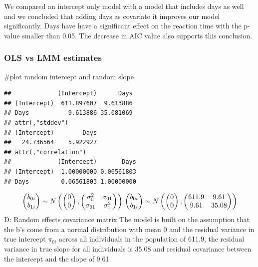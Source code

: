 \documentclass[
]{article}
\begin{document}
We compared an intercept only model with a model that includes days as
well and we concluded that adding days as covariate it improves our
model significantly. Days have have a significant effect on the reaction
time with the p-value smaller than 0.05. The decrease in AIC value also
supports this conclusion.

\hypertarget{ols-vs-lmm-estimates}{%
\subsubsection{OLS vs LMM estimates}\label{ols-vs-lmm-estimates}}

\#plot random intercept and random slope

\begin{verbatim}
##             (Intercept)      Days
## (Intercept)  611.897607  9.613886
## Days           9.613886 35.081069
## attr(,"stddev")
## (Intercept)        Days 
##   24.736564    5.922927 
## attr(,"correlation")
##             (Intercept)       Days
## (Intercept)  1.00000000 0.06561803
## Days         0.06561803 1.00000000
\end{verbatim}

\[\begin{pmatrix}
b_{0i} \\
b_{1i}
\end{pmatrix}
\sim
N\begin{pmatrix}
\begin{pmatrix}
0 \\
0
\end{pmatrix},
\begin{pmatrix}
\sigma_{0}^2 & \sigma_{01} \\
\sigma_{01} & \sigma_{1}^2 
\end{pmatrix}
\end{pmatrix}\\
\begin{pmatrix}
b_{0i} \\
b_{1i}
\end{pmatrix}
\sim
N\begin{pmatrix}
\begin{pmatrix}
0 \\
0
\end{pmatrix},
\begin{pmatrix}
611.9 & 9.61 \\
9.61 & 35.08 
\end{pmatrix}
\end{pmatrix}
\] D: Random effects covariance matrix The model is built on the
assumption that the b's come from a normal distribution with mean 0 and
the residual variance in true intercept \(\pi_{0i}\) across all
individuals in the population of 611.9, the residual variance in true
slope for all individuals is 35.08 and residual covariance between the
intercept and the slope of 9.61.
\end{document}
